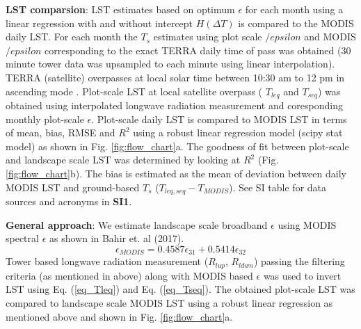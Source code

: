 \documentclass[fleqn,10pt]{wlscirep}
\begin{document}
{{\textbf{LST comparsion}: LST estimates based on optimum $\epsilon$ for each month using a linear regression with and without intercept $H(\Delta T)$ is compared to the MODIS daily LST. For each month the $T_{s}$ estimates using plot scale $/epsilon$ and MODIS $/epsilon$ corresponding to the exact TERRA daily time of pass was obtained (30 minute tower data was upsampled to each minute using linear interpolation). TERRA (satellite) overpasses at local solar time between 10:30 am to 12 pm in ascending mode \cite{guillevic2017land}. Plot-scale LST at local satellite overpass ( $T_{leq}$ and $T_{seq}$) was obtained using interpolated longwave radiation measurement %
and coresponding monthly plot-scale $\epsilon$. Plot-scale daily LST is compared to MODIS LST in terms of mean, bias, RMSE and $R^2$ using a robust linear regression model (scipy stat model) %
 as shown in Fig. \ref{fig:flow_chart}a. The goodness of fit between plot-scale and landscape scale LST was determined by looking at $R^2$ (Fig. \ref{fig:flow_chart}b). The bias is estimated as the mean of deviation between daily MODIS LST and ground-based $T_{s}$ ($T_{leq,seq} - T_{MODIS}$). See SI table for data sources and acronyms in \textbf{SI1}.



\textbf{General approach}:
We estimate landscape scale broadband $\epsilon$ using MODIS spectral $\epsilon$ as shown in Bahir et. al (2017)\cite{bahir_evaluation_2017}.
\begin{equation}\label{eq_emodis}
\epsilon_{MODIS}= 0.4587 \epsilon_{31} + 0.5414 \epsilon_{32}
\end{equation}
Tower based longwave radiation measurement ($R_{lup}$, $R_{ldwn}$) passing the filtering criteria (as mentioned in above) along with MODIS based $\epsilon$ was used to invert LST using Eq. (\ref{eq_Tleq}) and  Eq. (\ref{eq_Tseq}). The obtained plot-scale LST was compared to landscape scale MODIS LST using a robust linear regression as mentioned above and shown in Fig. \ref{fig:flow_chart}a.


}}
\end{document}
